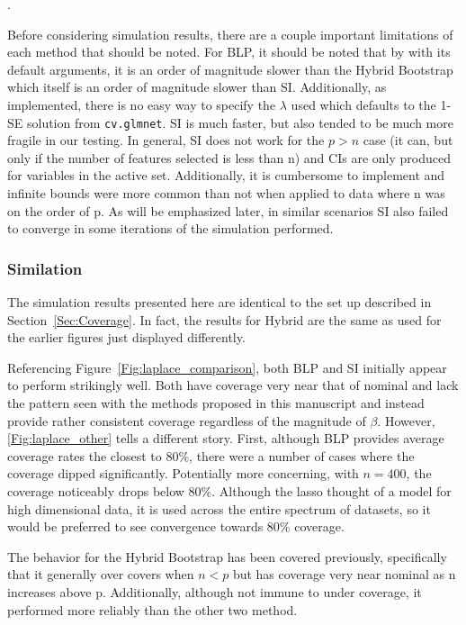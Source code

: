 .

Before considering simulation results, there are a couple important limitations of each method that should be noted. For BLP, it should be noted that by with its default arguments, it is an order of magnitude slower than the Hybrid Bootstrap which itself is an order of magnitude slower than SI. Additionally, as implemented, there is no easy way to specify the $\lambda$ used which defaults to the 1-SE solution from \texttt{cv.glmnet}. SI is much faster, but also tended to be much more fragile in our testing. In general, SI does not work for the $p > n$ case (it can, but only if the number of features selected is less than n) and CIs are only produced for variables in the active set. Additionally, it is cumbersome to implement and infinite bounds were more common than not when applied to data where n was on the order of p. As will be emphasized later, in similar scenarios SI also failed to converge in some iterations of the simulation performed. 

\subsubsection{Similation}

The simulation results presented here are identical to the set up described in Section~\ref{Sec:Coverage}. In fact, the results for Hybrid are the same as used for the earlier figures just displayed differently. 

Referencing Figure~\ref{Fig:laplace_comparison}, both BLP and SI initially appear to perform strikingly well. Both have coverage very near that of nominal and lack the pattern seen with the methods proposed in this manuscript and instead provide rather consistent coverage regardless of the magnitude of $\beta$. However, \ref{Fig:laplace_other} tells a different story. First, although BLP provides average coverage rates the closest to $80\%$, there were a number of cases where the coverage dipped significantly. Potentially more concerning, with $n = 400$, the coverage noticeably drops below 80\%. Although the lasso thought of a model for high dimensional data, it is used across the entire spectrum of datasets, so it would be preferred to see convergence towards 80\% coverage.

The behavior for the Hybrid Bootstrap has been covered previously, specifically that it generally over covers when $n < p$ but has coverage very near nominal as n increases above p. Additionally, although not immune to under coverage, it performed more reliably than the other two method.

